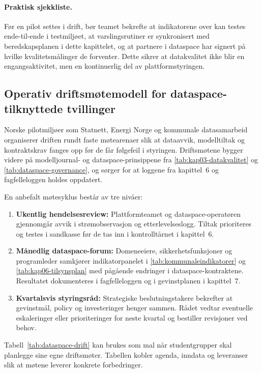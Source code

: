 \paragraph{Praktisk sjekkliste.} Før en pilot settes i drift, bør teamet bekrefte at indikatorene over kan testes ende-til-ende i testmiljøet, at varslingsrutiner er synkronisert med beredskapsplanen i dette kapittelet, og at partnere i dataspace har signert på hvilke kvalitetsmålinger de forventer. Dette sikrer at datakvalitet ikke blir en engangsaktivitet, men en kontinuerlig del av plattformstyringen.

\subsection{Operativ driftsmøtemodell for dataspace-tilknyttede tvillinger}
Norske pilotmiljøer som Statnett, Energi Norge og kommunale datasamarbeid organiserer driften rundt faste møtearenaer slik at dataavvik, modelltiltak og kontraktskrav fanges opp før de får følgefeil i styringen.\citep{statnett2023digital,energinorge2023beredskap} Driftsmøtene bygger videre på modelljournal- og dataspace-prinsippene fra \autoref{tab:kap03-datakvalitet} og \autoref{tab:dataspace-governance}, og sørger for at loggene fra kapittel~6 og fagfelleloggen holdes oppdatert.\citep{digdir2023modelljournal}

En anbefalt møtesyklus består av tre nivåer:
\begin{enumerate}
    \item \textbf{Ukentlig hendelsesreview:} Plattformteamet og dataspace-operatøren gjennomgår avvik i strømobservasjon og etterlevelseslogg. Tiltak prioriteres og testes i sandkasse før de tas inn i kontrolltårnet i kapittel~6.
    \item \textbf{Månedlig dataspace-forum:} Domeneeiere, sikkerhetsfunksjoner og programleder samkjører indikatorpanelet i \autoref{tab:kommunaleindikatorer} og \autoref{tab:kap06-tilsynsplan} med pågående endringer i dataspace-kontraktene. Resultatet dokumenteres i fagfelleloggen og i gevinstplanen i kapittel~7.
    \item \textbf{Kvartalsvis styringsråd:} Strategiske beslutningstakere bekrefter at gevinstmål, policy og investeringer henger sammen. Rådet vedtar eventuelle eskaleringer eller prioriteringer for neste kvartal og bestiller revisjoner ved behov.
\end{enumerate}

Tabell~\ref{tab:dataspace-drift} kan brukes som mal når studentgrupper skal planlegge sine egne driftsmøter. Tabellen kobler agenda, inndata og leveranser slik at møtene leverer konkrete forbedringer.

